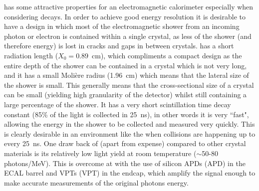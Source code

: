 \PbWO has some attractive properties for an electromagnetic calorimeter especially when considering \Hgg decays. In order to achieve good energy resolution it is desirable to have a design in which most of the electromagnetic shower from an incoming photon or electron is contained within a single crystal, as less of the shower (and therefore energy) is lost in cracks and gaps in between crystals. \PbWO has a short radiation length ($X_{0}=0.89$~cm), which compliments a compact design as the entire depth of the shower can be contained in a crystal which is not very long, and it has a small Moli\`{e}re radius (1.96~cm) which means that the lateral size of the shower is small. This generally means that the cross-sectional size of a crystal can be small (yielding high granularity of the detector) whilst still containing a large percentage of the shower. It has a very short scintillation time decay constant (85\% of the light is collected in 25~ns), in other words it is very ``fast", allowing the energy in the shower to be collected and measured very quickly. This is clearly desirable in an environment like the \LHC when collisions are happening up to every 25~ns. One draw back of \PbWO (apart from expense) compared to other crystal materials is its relatively low light yield at room temperature ($\sim$50-80 photons/MeV). This is overcome at \CMS with the use of silicon \aclp{APD} (\acs{APD}) in the ECAL barrel and \aclp{VPT} (\acs{VPT}) in the endcap, which amplify the signal enough to make accurate measurements of the original photons energy. 
